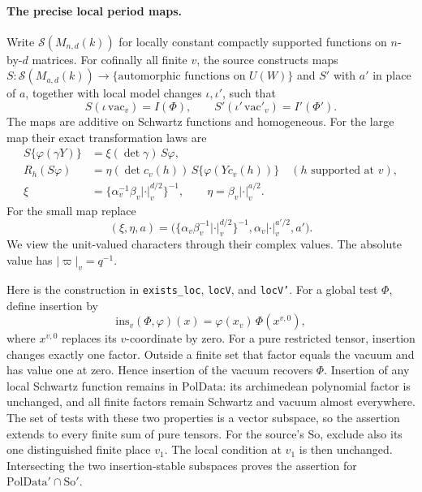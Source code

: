 \paragraph{The precise local period maps.}
Write \(\mathcal S(M_{n,d}(k))\) for locally constant compactly
supported functions on \(n\)-by-\(d\) matrices.
For cofinally all finite \(v\), the source constructs maps
\(S:\mathcal S(M_{a,d}(k))\to\{\text{automorphic functions on }U(W)\}\)
and \(S'\) with \(a'\) in place of \(a\), together with local
model changes \(\iota,\iota'\), such that
\[
 S(\iota\,\mathrm{vac}_v)=I(\Phi),\qquad
 S'(\iota'\,\mathrm{vac}'_v)=I'(\Phi').
 \tag{AK2}\label{eq:sr-source-local-period-values}
\]
The maps are additive on Schwartz functions and homogeneous.
For the large map their exact transformation laws are
\[
 \begin{split}
 S\{\varphi(\gamma Y)\}
       &=\xi(\det\gamma)\,S\varphi,\\
 R_h(S\varphi)&=\eta(\det c_v(h))\,
                     S\{\varphi(Yc_v(h))\}
                   \quad(h\text{ supported at }v),\\
 \xi&=\{\alpha_v^{-1}\beta_v|\cdot|_v^{d/2}\}^{-1},
 \qquad \eta=\beta_v|\cdot|_v^{a/2}.
 \end{split} \tag{AK3}\label{eq:sr-source-local-period-laws}
\]
For the small map replace
\[
 (\xi,\eta,a)=
 \bigl(\{\alpha_v\beta_v^{-1}|\cdot|_v^{d/2}\}^{-1},
              \alpha_v|\cdot|_v^{a'/2},a'\bigr).
 \tag{AK4}\label{eq:sr-source-small-local-period-laws}
\]
We view the unit-valued characters through their complex values.
The absolute value has \(|\varpi|_v=q^{-1}\).

Here is the construction in \texttt{exists\_loc},
\texttt{locV}, and \texttt{locV'}.
For a global test \(\Phi\), define insertion by
\[
 \mathrm{ins}_v(\Phi,\varphi)(x)
   =\varphi(x_v)\,\Phi(x^{v,0}),
\]
where \(x^{v,0}\) replaces its \(v\)-coordinate by zero.
For a pure restricted tensor, insertion changes exactly one factor.
Outside a finite set that factor equals the vacuum and has value
one at zero. Hence insertion of the vacuum recovers \(\Phi\).
Insertion of any local Schwartz function remains in
\(\mathrm{PolData}\): its archimedean polynomial factor is unchanged,
and all finite factors remain Schwartz and vacuum almost everywhere.
The set of tests with these two properties is a vector subspace,
so the assertion extends to every finite sum of pure tensors.
For the source's \(\mathrm{So}\), exclude also its one distinguished
finite place \(v_1\). The local condition at \(v_1\) is then unchanged.
Intersecting the two insertion-stable subspaces proves the assertion
for \(\mathrm{PolData}'\cap\mathrm{So}'\).

